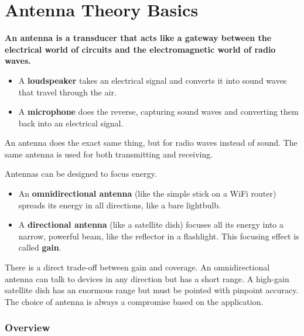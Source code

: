 
\chapter{Antenna Theory Basics}
\label{ch:antenna}

\begin{nontechnical}
    \textbf{An antenna is a transducer that acts like a gateway between the electrical world of circuits and the electromagnetic world of radio waves.}

    \begin{itemize}
        \item A \textbf{loudspeaker} takes an electrical signal and converts it into sound waves that travel through the air.
        \item A \textbf{microphone} does the reverse, capturing sound waves and converting them back into an electrical signal.
    \end{itemize}
    An antenna does the exact same thing, but for radio waves instead of sound. The same antenna is used for both transmitting and receiving.

    Antennas can be designed to focus energy.
    \begin{itemize}
        \item An \textbf{omnidirectional antenna} (like the simple stick on a WiFi router) spreads its energy in all directions, like a bare lightbulb.
        \item A \textbf{directional antenna} (like a satellite dish) focuses all its energy into a narrow, powerful beam, like the reflector in a flashlight. This focusing effect is called \textbf{gain}.
    \end{itemize}

    There is a direct trade-off between gain and coverage. An omnidirectional antenna can talk to devices in any direction but has a short range. A high-gain satellite dish has an enormous range but must be pointed with pinpoint accuracy. The choice of antenna is always a compromise based on the application.
\end{nontechnical}


\subsection{Overview}

